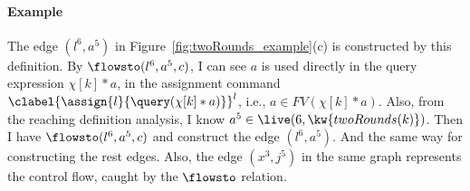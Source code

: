   \paragraph*{Example}
The edge $(l^6, a^5)$ in Figure~\ref{fig:twoRounds_example}(c) is constructed by this definition.
By $\flowsto(l^6, a^5, c)$, I can see $a$ is used directly in the query expression $\chi[k]*a$,
in the assignment command $\clabel{\assign{l}{\query(\chi[k]*a)}}^l$,
i.e., $a \in FV(\chi[k]*a)$.
Also, from the reaching definition analysis, I know $a^5 \in \live(6, \kw{twoRounds(k)})$.
Then I have $\flowsto(l^6, a^5, c)$ and construct the edge $(l^6, a^5)$.
And the same way for constructing the rest edges. Also, the edge $(x^3,j^5)$ in the same graph represents the control flow, 
caught by the $\flowsto$ relation.
%
